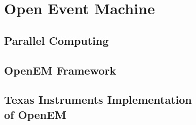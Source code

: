 \chapter{Open Event Machine}
\label{chapter:openem}


\section{Parallel Computing}
\label{sec:parallel-computing}


\section{OpenEM Framework}
\label{sec:emframework}


\section[Texas Instruments Implementation of OpenEM]{Texas Instruments Implementation\\of OpenEM}
\label{sec:tiopenem}

